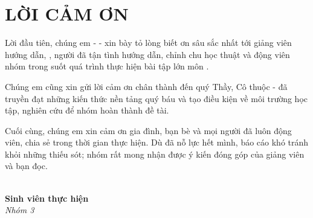 \chapter*{LỜI CẢM ƠN}

Lời đầu tiên, chúng em - \textbf{\GroupCode} - xin bày tỏ lòng biết ơn sâu sắc nhất tới
giảng viên hướng dẫn, \textbf{\InstructorName}, người đã tận tình hướng dẫn, chỉnh chu
học thuật và động viên nhóm trong suốt quá trình thực hiện bài tập lớn môn
\textbf{\CourseName}.

Chúng em cũng xin gửi lời cảm ơn chân thành đến quý Thầy, Cô thuộc
\textbf{\InstituteName} - \textbf{\UnivName} đã truyền đạt những kiến thức nền tảng
quý báu và tạo điều kiện về môi trường học tập, nghiên cứu để nhóm hoàn thành đề tài.

Cuối cùng, chúng em xin cảm ơn gia đình, bạn bè và mọi người đã luôn động viên, chia sẻ
trong thời gian thực hiện. Dù đã nỗ lực hết mình, báo cáo khó tránh khỏi những thiếu sót;
nhóm rất mong nhận được ý kiến đóng góp của giảng viên và bạn đọc.

\vspace{1cm}
\begin{flushright}
    \textit{\LocationDate}\\[0.2cm]
    \textbf{Sinh viên thực hiện}\\[0.2cm]
    \textit{Nhóm 3}
\end{flushright}
